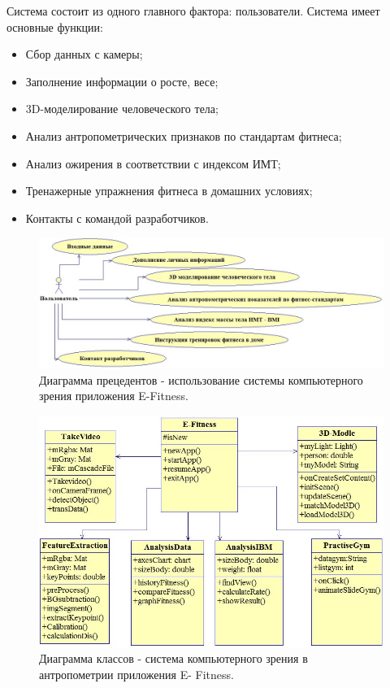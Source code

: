 Система состоит из одного главного фактора: пользователи. Система имеет основные функции:

\begin{itemize}
	\item Сбор данных с камеры;
	\item Заполнение информации о росте, весе;
	\item 3D-моделирование человеческого тела;
	\item Анализ антропометрических признаков по стандартам фитнеса;
	\item Анализ ожирения в соответствии с индексом ИМТ;
	\item Тренажерные упражнения фитнеса в домашних условиях;
	\item Контакты с командой разработчиков.

\end{itemize}
\begin{figure}[ht!]
\centering
\includegraphics [scale=0.5] {images/h25.png}
\begin{center}
\caption{Диаграмма прецедентов - использование системы компьютерного зрения приложения E-Fitness.} \label{img25}
\end{center}
\end{figure}
\begin{figure}[ht!]
\centering
\includegraphics [scale=0.5] {images/h26.png}
\begin{center}
\caption{Диаграмма классов - система компьютерного зрения в антропометрии приложения E- Fitness.} \label{img26}
\end{center}
\end{figure}
